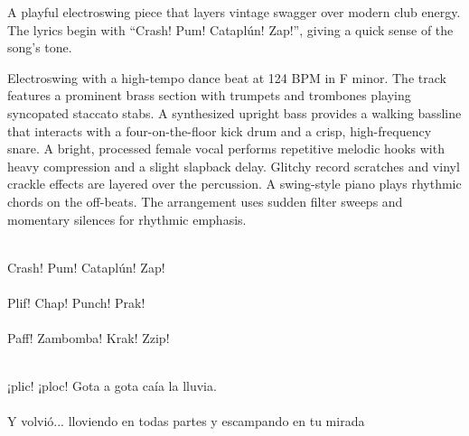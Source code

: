 

\begin{notes}
A playful electroswing piece that layers vintage swagger over modern club energy. %
The lyrics begin with “Crash! Pum! Cataplún! Zap!”, giving a quick sense of the song’s tone.
\end{notes}

\begin{style}
Electroswing with a high-tempo dance beat at 124 BPM in F minor. %
The track features a prominent brass section with trumpets and trombones playing syncopated staccato stabs. %
A synthesized upright bass provides a walking bassline that interacts with a four-on-the-floor kick drum and a crisp, high-frequency snare. %
A bright, processed female vocal performs repetitive melodic hooks with heavy compression and a slight slapback delay. %
Glitchy record scratches and vinyl crackle effects are layered over the percussion. %
A swing-style piano plays rhythmic chords on the off-beats. %
The arrangement uses sudden filter sweeps and momentary silences for rhythmic emphasis.
\end{style}

\begin{lyrics}

\\
Crash! Pum! Cataplún! Zap!\\
\\
Plif! Chap! Punch! Prak!\\
\\
Paff! Zambomba! Krak! Zzip!

\\
¡plic! ¡ploc! Gota a gota caía la lluvia.\\

\\
Y volvió... %
lloviendo en todas partes y escampando en tu mirada

\end{lyrics}

